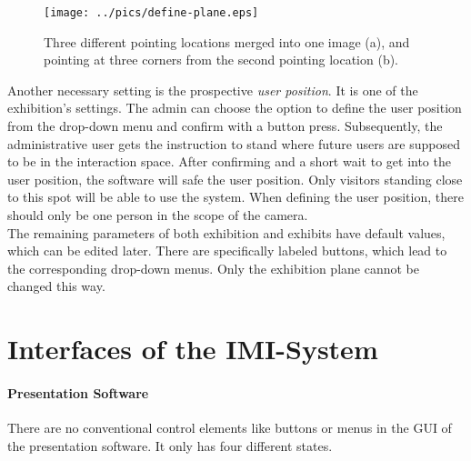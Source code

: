 \begin{figure}[H]%
\texttt{[image: ../pics/define-plane.eps]}%
\caption{Three different pointing locations merged into one image (a), and pointing at three corners from the second pointing location (b).}%
\label{fig:ideo_cali}%
\end{figure}

Another necessary setting is the prospective \textit{user position}. It is one of the exhibition's settings. The admin can choose the option to define the user position from the drop-down menu and confirm with a button press. Subsequently, the administrative user gets the instruction to stand where future users are supposed to be in the interaction space. After confirming and a short wait to get into the user position, the software will safe the user position. Only visitors standing close to this spot will be able to use the system. When defining the user position, there should only be one person in the scope of the camera.
\\
The remaining parameters of both exhibition and exhibits have default values, which can be edited later. There are specifically labeled buttons, which lead to the corresponding drop-down menus. Only the exhibition plane cannot be changed this way.


\section{Interfaces of the \ac{IMI}-System} 

\paragraph{Presentation Software} There are no conventional control elements like buttons or menus in the \ac{GUI} of the presentation software. It only has four different states.

